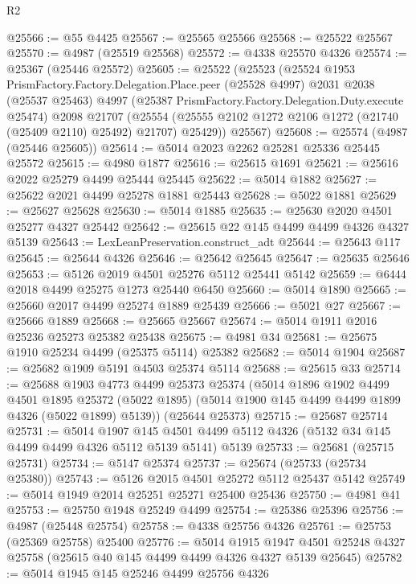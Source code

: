 \begin{lexlean}{R2}
\begin{coremodule}
@25566 := @55 @4425
@25567 := @25565 @25566
@25568 := @25522 @25567
@25570 := @4987 (@25519 @25568)
@25572 := @4338 @25570 @4326
@25574 := @25367 (@25446 @25572)
@25605 := @25522
    (@25523
      (@25524
        @1953
        PrismFactory.Factory.Delegation.Place.peer
        (@25528 @4997)
        @2031
        @2038
        (@25537 @25463)
        @4997
        (@25387 PrismFactory.Factory.Delegation.Duty.execute @25474)
        @2098
        @21707
        (@25554 (@25555 @2102 @1272 @2106 @1272 (@21740 (@25409 @2110) @25492) @21707) @25429))
      @25567)
@25608 := @25574 (@4987 (@25446 @25605))
@25614 := @5014 @2023 @2262 @25281 @25336 @25445 @25572
@25615 := @4980 @1877
@25616 := @25615 @1691
@25621 := @25616 @2022 @25279 @4499 @25444 @25445
@25622 := @5014 @1882
@25627 := @25622 @2021 @4499 @25278 @1881 @25443
@25628 := @5022 @1881
@25629 := @25627 @25628
@25630 := @5014 @1885
@25635 := @25630 @2020 @4501 @25277 @4327 @25442
@25642 := @25615 @22 @145 @4499 @4499 @4326 @4327 @5139
@25643 := LexLeanPreservation.construct_adt
@25644 := @25643 @117
@25645 := @25644 @4326
@25646 := @25642 @25645
@25647 := @25635 @25646
@25653 := @5126 @2019 @4501 @25276 @5112 @25441 @5142
@25659 := @6444 @2018 @4499 @25275 @1273 @25440 @6450
@25660 := @5014 @1890
@25665 := @25660 @2017 @4499 @25274 @1889 @25439
@25666 := @5021 @27
@25667 := @25666 @1889
@25668 := @25665 @25667
@25674 := @5014 @1911 @2016 @25236 @25273 @25382 @25438
@25675 := @4981 @34
@25681 := @25675 @1910 @25234 @4499 (@25375 @5114) @25382
@25682 := @5014 @1904
@25687 := @25682 @1909 @5191 @4503 @25374 @5114
@25688 := @25615 @33
@25714 := @25688
    @1903
    @4773
    @4499
    @25373
    @25374
    (@5014
      @1896
      @1902
      @4499
      @4501
      @1895
      @25372
      (@5022 @1895)
      (@5014 @1900 @145 @4499 @4499 @1899 @4326 (@5022 @1899) @5139))
    (@25644 @25373)
@25715 := @25687 @25714
@25731 := @5014
    @1907
    @145
    @4501
    @4499
    @5112
    @4326
    (@5132 @34 @145 @4499 @4499 @4326 @5112 @5139 @5141)
    @5139
@25733 := @25681 (@25715 @25731)
@25734 := @5147 @25374
@25737 := @25674 (@25733 (@25734 @25380))
@25743 := @5126 @2015 @4501 @25272 @5112 @25437 @5142
@25749 := @5014 @1949 @2014 @25251 @25271 @25400 @25436
@25750 := @4981 @41
@25753 := @25750 @1948 @25249 @4499
@25754 := @25386 @25396
@25756 := @4987 (@25448 @25754)
@25758 := @4338 @25756 @4326
@25761 := @25753 (@25369 @25758) @25400
@25776 := @5014
    @1915
    @1947
    @4501
    @25248
    @4327
    @25758
    (@25615 @40 @145 @4499 @4499 @4326 @4327 @5139 @25645)
@25782 := @5014 @1945 @145 @25246 @4499 @25756 @4326

\end{coremodule}
\end{lexlean}
